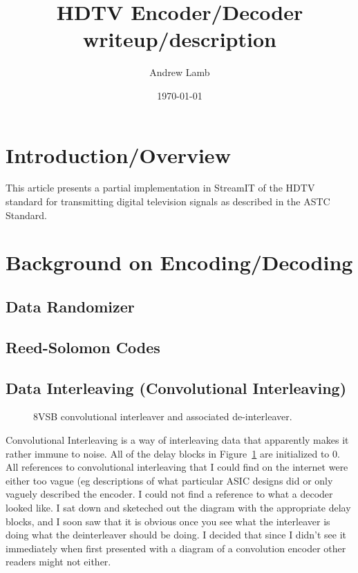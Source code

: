 \documentclass{article}
\title{HDTV Encoder/Decoder writeup/description}
\author{Andrew Lamb}
\date{\today}
\begin{document}
\maketitle
\newpage

\section{Introduction/Overview}
This article presents a partial implementation in StreamIT of the HDTV standard 
for transmitting digital television signals as described in 
the ASTC Standard\cite{atsc:a53b}.

\section{Background on Encoding/Decoding}

\subsection{Data Randomizer}

\subsection{Reed-Solomon Codes}

\subsection{Data Interleaving (Convolutional Interleaving)}
\begin{figure}
\center
\epsfxsize=5.5in
\caption{8VSB convolutional interleaver and associated de-interleaver.}
\label{fig:convolution-interleaver}
\end{figure}

Convolutional Interleaving is a way of interleaving data that apparently makes
it rather immune to noise. All of the delay blocks in Figure~\ref{fig:convolution-interleaver}
are initialized to 0. All references to convolutional interleaving that I could find
on the internet were either too vague (eg descriptions of what particular ASIC designs did
or only vaguely described the encoder. I could not find a reference to what a decoder looked 
like. I sat down and sketeched out the diagram with the appropriate delay blocks, and I soon 
saw that it is obvious once you see what the interleaver is doing what the deinterleaver should
be doing. I decided that since I didn't see it immediately when first presented with a
diagram of a convolution encoder other readers might not either.
\end{document}
